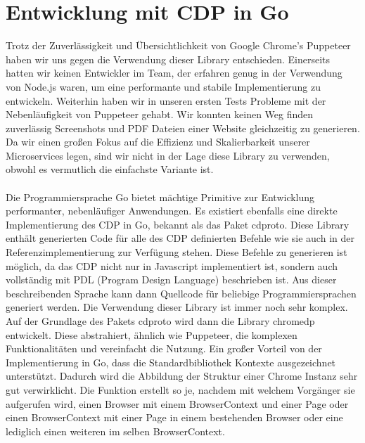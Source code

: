 \section{Entwicklung mit CDP in Go} \label{scraper:sec:chromedp}
Trotz der Zuverlässigkeit und Übersichtlichkeit von Google Chrome’s Puppeteer haben wir uns gegen die Verwendung dieser Library entschieden. Einerseits hatten wir keinen Entwickler im Team, der erfahren genug in der Verwendung von Node.js waren, um eine performante und stabile Implementierung zu entwickeln. Weiterhin haben wir in unseren ersten Tests Probleme mit der Nebenläufigkeit von Puppeteer gehabt. Wir konnten keinen Weg finden zuverlässig Screenshots und PDF Dateien einer Website gleichzeitig zu generieren. Da wir einen großen Fokus auf die Effizienz und Skalierbarkeit unserer Microservices legen, sind wir nicht in der Lage diese Library zu verwenden, obwohl es vermutlich die einfachste Variante ist. \\ \\
Die Programmiersprache Go bietet mächtige Primitive zur Entwicklung performanter, nebenläufiger Anwendungen. Es existiert ebenfalls eine direkte Implementierung des CDP in Go, bekannt als das Paket cdproto. Diese Library enthält generierten Code für alle des CDP definierten Befehle wie sie auch in der Referenzimplementierung zur Verfügung stehen. Diese Befehle zu generieren ist möglich, da das CDP nicht nur in Javascript implementiert ist, sondern auch vollständig mit PDL (Program Design Language) beschrieben ist. Aus dieser beschreibenden Sprache kann dann Quellcode für beliebige Programmiersprachen generiert werden.  \cite{cdprotogen}
Die Verwendung dieser Library ist immer noch sehr komplex. Auf der Grundlage des Pakets cdproto wird dann die Library chromedp entwickelt. Diese abstrahiert, ähnlich wie Puppeteer, die komplexen Funktionalitäten und vereinfacht die Nutzung. Ein großer Vorteil von der Implementierung in Go, dass die Standardbibliothek Kontexte ausgezeichnet unterstützt. \cite{go_context} Dadurch wird die Abbildung der Struktur einer Chrome Instanz sehr gut verwirklicht. Die Funktion  
erstellt so je, nachdem mit welchem Vorgänger sie aufgerufen wird, einen Browser mit einem BrowserContext und einer Page oder einen BrowserContext mit einer Page in einem bestehenden Browser oder eine lediglich einen weiteren  im selben BrowserContext.

